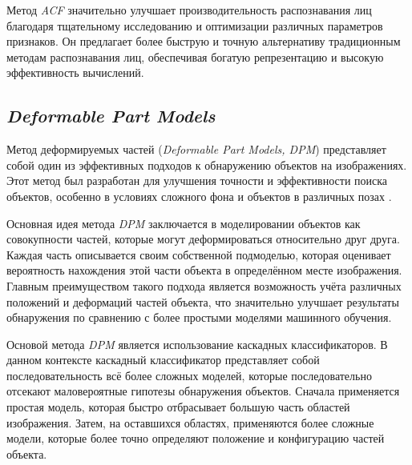 Метод \textit{ACF} значительно улучшает производительность распознавания лиц благодаря тщательному исследованию и оптимизации различных параметров признаков. Он предлагает более быструю и точную альтернативу традиционным методам распознавания лиц, обеспечивая богатую репрезентацию и высокую эффективность вычислений.

\subsection{\textit{Deformable Part Models}}
Метод деформируемых частей (\textit{Deformable Part Models, DPM}) представляет собой один из эффективных подходов к обнаружению объектов на изображениях. Этот метод был разработан для улучшения точности и эффективности поиска объектов, особенно в условиях сложного фона и объектов в различных позах \cite{DPM}. 

Основная идея метода \textit{DPM} заключается в моделировании объектов как совокупности частей, которые могут деформироваться относительно друг друга. Каждая часть описывается своим собственной подмоделью, которая оценивает вероятность нахождения этой части объекта в определённом месте изображения. Главным преимуществом такого подхода является возможность учёта различных положений и деформаций частей объекта, что значительно улучшает результаты обнаружения по сравнению с более простыми моделями машинного обучения.

Основой метода \textit{DPM} является использование каскадных классификаторов. В данном контексте каскадный классификатор представляет собой последовательность всё более сложных моделей, которые последовательно отсекают маловероятные гипотезы обнаружения объектов. Сначала применяется простая модель, которая быстро отбрасывает большую часть областей изображения. Затем, на оставшихся областях, применяются более сложные модели, которые более точно определяют положение и конфигурацию частей объекта.

